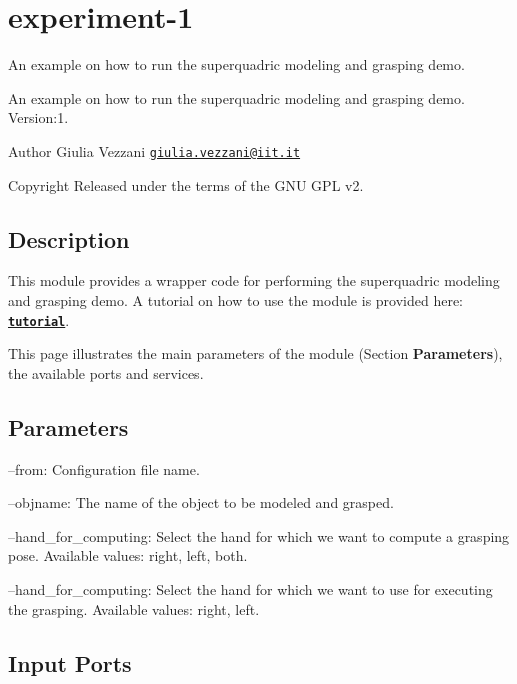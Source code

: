 \section{experiment-\/1}
\label{group__experiment-1}


An example on how to run the superquadric modeling and grasping demo.  


An example on how to run the superquadric modeling and grasping demo. Version\-:1. \begin{DoxyAuthor}{Author}
Giulia Vezzani \href{mailto:giulia.vezzani@iit.it}{\tt giulia.\-vezzani@iit.\-it} \par
 
\end{DoxyAuthor}
\begin{DoxyCopyright}{Copyright}
Released under the terms of the G\-N\-U G\-P\-L v2. 
\end{DoxyCopyright}
\hypertarget{group__experiment-1_intro_sec}{}\subsection{Description}\label{group__experiment-1_intro_sec}
This module provides a wrapper code for performing the superquadric modeling and grasping demo. A tutorial on how to use the module is provided here\-: \href{https://github.com/robotology/superquadric-grasp-example/tree/gh-pages/experiment-1#how-to-run-the-code}{\tt {\bfseries tutorial}}.

This page illustrates the main parameters of the module (Section {\bfseries Parameters}), the available ports and services.\hypertarget{group__experiment-1_parameters_sec}{}\subsection{Parameters}\label{group__experiment-1_parameters_sec}

\begin{DoxyItemize}
\item --from\-: Configuration file name.
\item --objname\-: The name of the object to be modeled and grasped.
\item --hand\-\_\-for\-\_\-computing\-: Select the hand for which we want to compute a grasping pose. Available values\-: right, left, both.
\item --hand\-\_\-for\-\_\-computing\-: Select the hand for which we want to use for executing the grasping. Available values\-: right, left. 
\end{DoxyItemize}\hypertarget{group__experiment-1_inputports_sec}{}\subsection{Input Ports}\label{group__experiment-1_inputports_sec}

